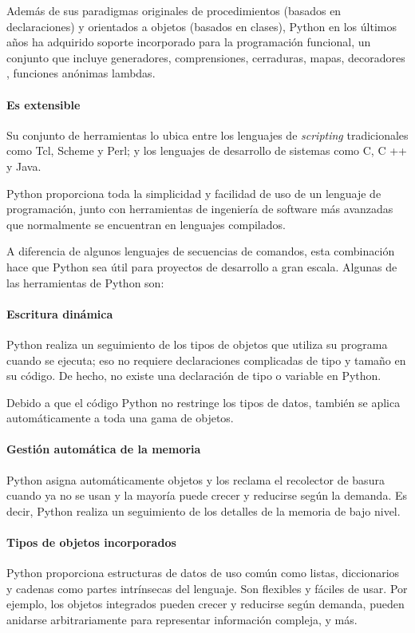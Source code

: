Además de sus paradigmas originales de procedimientos (basados ​​en declaraciones) y orientados a objetos (basados ​​en clases), Python en los últimos años ha adquirido soporte incorporado para la programación funcional, un conjunto que incluye generadores, comprensiones, cerraduras, mapas, decoradores , funciones anónimas lambdas.

\paragraph*{Es extensible}
Su conjunto de herramientas lo ubica entre los lenguajes de \textit{scripting} tradicionales como Tcl, Scheme y Perl; y los lenguajes de desarrollo de sistemas como C, C ++ y Java.


Python proporciona toda la simplicidad y facilidad de uso de un lenguaje de programación, junto con herramientas de ingeniería de software más avanzadas que normalmente se encuentran en lenguajes compilados.

A diferencia de algunos lenguajes de secuencias de comandos, esta combinación hace que Python sea útil para proyectos de desarrollo a gran escala. Algunas de las herramientas de Python son:
\paragraph*{Escritura dinámica}
Python realiza un seguimiento de los tipos de objetos que utiliza su programa cuando se ejecuta; eso no requiere declaraciones complicadas de tipo y tamaño en su código. De hecho, no existe una declaración de tipo o variable en Python. 


Debido a que el código Python no restringe los tipos de datos, también se aplica automáticamente a toda una gama de objetos.

\paragraph*{Gestión automática de la memoria}
Python asigna automáticamente objetos y los reclama el recolector de basura cuando ya no se usan y la mayoría puede crecer y reducirse según la demanda. Es decir, Python realiza un seguimiento de los detalles de la memoria de bajo nivel.


\paragraph*{Tipos de objetos incorporados}
Python proporciona estructuras de datos de uso común como listas, diccionarios y cadenas como partes intrínsecas del lenguaje. Son flexibles y fáciles de usar. Por ejemplo, los objetos integrados pueden crecer y reducirse según demanda, pueden anidarse arbitrariamente para representar información compleja, y más.
